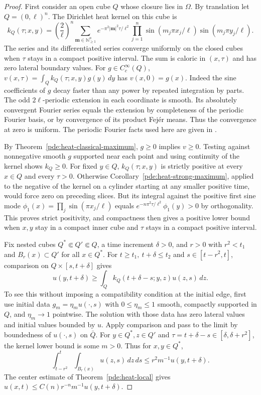 \documentclass[11pt,oneside,openany]{book}
\theoremstyle{plain}
\theoremstyle{definition}
\theoremstyle{remark}
\begin{document}
\begin{proof}
First consider an open cube \(Q\) whose closure lies in
\(\Omega\). By translation let \(Q=(0,\ell)^n\).
The Dirichlet heat kernel on this cube is
\[
 k_Q(\tau;x,y)=\left(\frac{2}{\ell}\right)^n
 \sum_{\mathbf m\in\mathbb N_{\geq1}^n}
   e^{-\pi^2|\mathbf m|^2\tau/\ell^2}
   \prod_{j=1}^n\sin(m_j\pi x_j/\ell)\sin(m_j\pi y_j/\ell).
\]
The series and its differentiated series converge uniformly on
the closed cubes when \(\tau\) stays in a compact positive
interval. The sum is caloric in \((x,\tau)\) and has zero
lateral boundary values. For \(g\in C_c^\infty(Q)\),
\(v(x,\tau)=\int_Q k_Q(\tau;x,y)g(y)\,dy\) has \(v(x,0)=g(x)\).
Indeed the sine coefficients of \(g\) decay faster than any
power by repeated integration by parts. The odd \(2\ell\)-periodic
extension in each coordinate is smooth. Its absolutely
convergent Fourier series equals the extension by completeness
of the periodic Fourier basis, or by convergence of its
product Fejér means. Thus the convergence at zero is uniform.
The periodic Fourier facts used here are given in
\cite[Unit U1]{P102}.

By Theorem~\ref{pde:heat-classical-maximum}, \(g\geq0\)
implies \(v\geq0\). Testing against nonnegative smooth \(g\)
supported near each point and using continuity of the kernel
shows \(k_Q\geq0\).
For fixed \(y\in Q\), \(k_Q(\tau;x,y)\) is strictly positive
at every \(x\in Q\) and every \(\tau>0\).
Otherwise Corollary~\ref{pde:heat-strong-maximum}, applied to the
negative of the kernel on a cylinder starting at any smaller
positive time, would force zero on preceding slices.
But its integral against the positive first sine mode
\(\phi_1(x)=\prod_j\sin(\pi x_j/\ell)\) equals
\(e^{-n\pi^2\tau/\ell^2}\phi_1(y)>0\) by orthogonality.
This proves strict positivity, and compactness then gives a
positive lower bound when \(x,y\) stay in a compact inner cube
and \(\tau\) stays in a compact positive interval.

Fix nested cubes \(Q^*\Subset Q'\Subset Q\), a time increment
\(\delta>0\), and \(r>0\) with \(r^2<t_1\) and
\(B_r(x)\subset Q'\) for all \(x\in Q^*\).
For \(t\geq t_1,\ t+\delta\leq t_2\) and
\(s\in[t-r^2,t]\), comparison on \(Q\times[s,t+\delta]\) gives
\[
 u(y,t+\delta)\geq \int_Q k_Q(t+\delta-s;y,z)u(z,s)\,dz .
\]
To see this without imposing a compatibility condition at the
initial edge, first use initial data
\(g_m=\eta_m u(\cdot,s)\) with \(0\leq\eta_m\leq1\) smooth,
compactly supported in \(Q\), and \(\eta_m\to1\) pointwise.
The solution with those data has zero lateral values and
initial values bounded by \(u\). Apply comparison and pass to
the limit by boundedness of \(u(\cdot,s)\) on \(\bar Q\).
For \(y\in Q^*,z\in Q'\) and
\(\tau=t+\delta-s\in[\delta,\delta+r^2]\), the kernel lower
bound is some \(m>0\). Thus for \(x,y\in Q^*\),
\[
 \int_{t-r^2}^t\int_{B_r(x)}u(z,s)\,dz\,ds
 \leq r^2 m^{-1}u(y,t+\delta).
\]
The center estimate of Theorem~\ref{pde:heat-local} gives
\(u(x,t)\leq C(n)r^{-n}m^{-1}u(y,t+\delta)\).


\end{proof}
\end{document}
